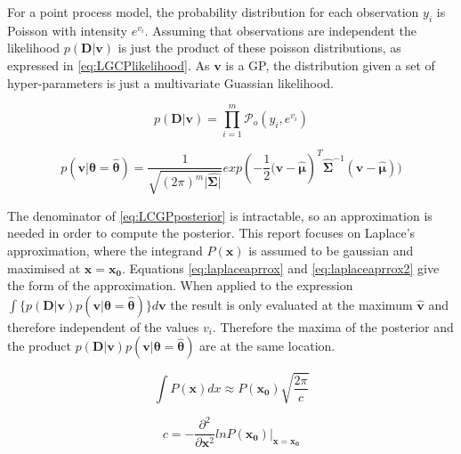 \documentclass[a4paper,11pt]{report}
\begin{document}
\doublespacing

For a point process model, the probability distribution for each observation \(y_i\) is Poisson with intensity \(e^{v_i}\). Assuming that observations are independent the likelihood \(p(\mathbf{D|v})\) is just the product of these poisson distributions, as expressed in \ref{eq:LGCPlikelihood}. As \(\mathbf{v}\) is a GP, the distribution given a set of hyper-parameters is just a multivariate Guassian likelihood. 

\singlespacing

\begin{equation} \label{eq:LGCPlikelihood}
p(\mathbf{D|v}) = \prod_{i=1}^{m} \mathcal{P}_o (y_i, e^{v_i})
\end{equation}

\begin{equation}
p(\mathbf{v}|\boldsymbol{\theta}=\hat{\boldsymbol{\theta}}) = \frac{1}{\sqrt{(2\pi)^{m} |\hat{\boldsymbol{\Sigma|}}}} exp(- \frac{1}{2} \mathbf{(v}-\hat{\boldsymbol{\mu}})^{T}\hat{\boldsymbol{\Sigma}}^{-1}(\mathbf{v}-\hat{\boldsymbol{\mu}}))
\end{equation}

\doublespacing

The denominator of \ref{eq:LCGPposterior} is intractable, so an approximation is needed in order to compute the posterior. This report focuses on Laplace's approximation, where the integrand \(P(\mathbf{x})\) is assumed to be gaussian and maximised at \(\mathbf{x=x_0}\). Equations \ref{eq:laplaceaprrox} and \ref{eq:laplaceaprrox2} give the form of the approximation. \cite{Mackay} When applied to the expression \(\int{\{p(\mathbf{D|v}) p(\mathbf{v}|\boldsymbol{\theta}=\hat{\boldsymbol{\theta}})\} d\mathbf{v}} \) the result is only evaluated at the maximum \(\hat{\mathbf{v}}\) and therefore independent of the values \(v_i\). Therefore the maxima of the posterior and the product \(p(\mathbf{D|v}) p(\mathbf{v}|\boldsymbol{\theta}=\hat{\boldsymbol{\theta}})\) are at the same location.

\singlespacing

\begin{equation} \label{eq:laplaceaprrox}
\int{P(\mathbf{x}) dx} \approx P(\mathbf{x_0}) \sqrt{\frac{2\pi}{c}}
\end{equation} 

\begin{equation} \label{eq:laplaceaprrox2}
c = - \frac{\partial^2}{\partial \mathbf{x}^2} ln P(\mathbf{x_0}) |_{\mathbf{x}=\mathbf{x_0}}
\end{equation}
\end{document}
